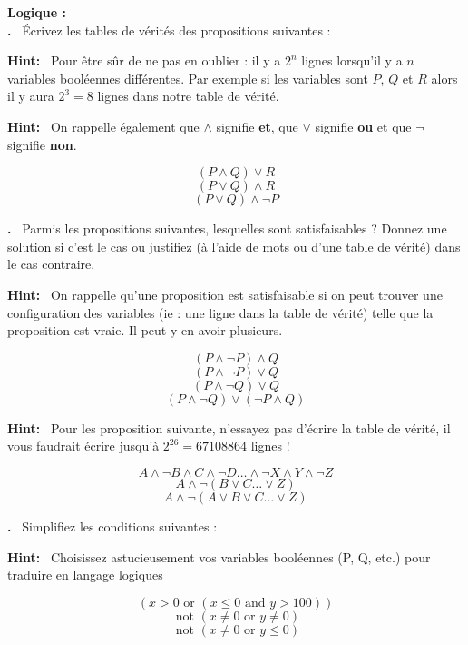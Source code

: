 \documentclass{article}
\newcounter{problem}
\newcounter{solution}
\newcommand\Problem{%
  \stepcounter{problem}%
  \textbf{\theproblem.}~%
  \setcounter{solution}{0}%
}
\newcommand\Hint{%
  \textbf{Hint:}~%
}
\begin{document}
\begin{abstract}
Voilà une petite série d'exercices pour vous entraîner sur les notions de logiques et d'algorithmie que nous avons vu lors des deux premiers cours. À titre indicatif : ce document a été rédigé à l'aide du langage de formatage \TeX\space  inventé par Donald Knuth lorsqu'il rédigeait \textit{The Art Of Computer Programming} en 1977 !
\end{abstract}

\textbf{Logique :}\\

\Problem Écrivez les tables de vérités des propositions suivantes :

\Hint Pour être sûr de ne pas en oublier : il y a \(2^n\) lignes lorsqu'il y a \(n\) variables booléennes différentes. Par exemple si les variables sont \(P\), \(Q\) et \(R\) alors il y aura \(2^3 = 8\) lignes dans notre table de vérité.

\Hint On rappelle également que \(\land\) signifie \textbf{et}, que \(\lor\) signifie \textbf{ou} et que \(\neg\) signifie \textbf{non}.

\[ (P \land Q) \lor R \]
\[ (P \lor Q) \land R \]
\[ (P \lor Q) \land \neg P \]

\Problem Parmis les propositions suivantes, lesquelles sont satisfaisables ? Donnez une solution si c'est le cas ou justifiez (à l'aide de mots ou d'une table de vérité) dans le cas contraire.

\Hint On rappelle qu'une proposition est satisfaisable si on peut trouver une configuration des variables (ie : une ligne dans la table de vérité) telle que la proposition est vraie. Il peut y en avoir plusieurs.

\[ (P \land \neg P) \land Q \]
\[ (P \land \neg P) \lor Q \]
\[ (P \land \neg Q) \lor Q \]
\[ (P \land \neg Q) \lor (\neg P \land Q) \]

\Hint Pour les proposition suivante, n'essayez pas d'écrire la table de vérité, il vous faudrait écrire jusqu'à \(2^{26} = 67108864\) lignes !

\[ A \land \neg B \land C \land \neg D \dots \land \neg X \land Y \land \neg Z \]
\[ A \land \neg (B \lor C \dots \lor Z) \]
\[ A \land \neg (A \lor B \lor C \dots \lor Z) \]


\Problem Simplifiez les conditions suivantes :

\Hint Choisissez astucieusement vos variables booléennes (P, Q, etc.) pour traduire en langage logiques

\[ ( x > 0 \text{ or } ( x \leq 0 \text{ and } y > 100 )) \]
\[ \text{ not } (x \neq 0 \text{ or } y \neq 0) \]
\[ \text{ not } (x \neq 0 \text{ or } y \leq 0) \]
\end{document}
